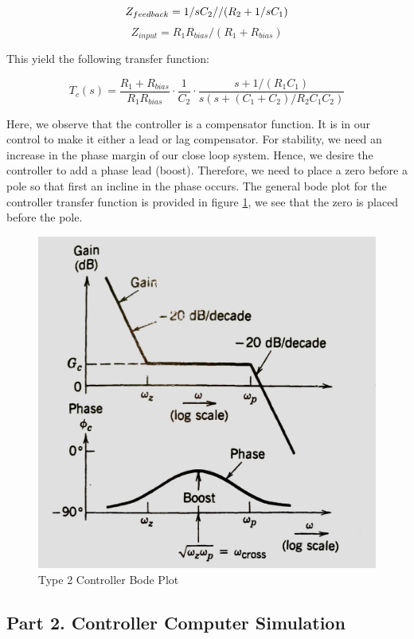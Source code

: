 \documentclass[12pt]{article}
\begin{document}
\begin{equation*}
    Z_{feedback}=1/sC_2// (R_2 +1/sC_1)\\
\end{equation*}
\begin{equation*}
Z_{input}=R_1 R_{bias}/(R_1 + R_{bias})
\end{equation*}

This yield the following transfer function:

\begin{equation*}
T_c(s)=\dfrac{R_1+R_{bias}}{R_1 R_{bias} }\cdot \dfrac{1}{C_2}\cdot \dfrac{s+1/(R_1 C_1)}{s(s+(C_1+C_2)/R_2C_1C_2)}
\end{equation*}

Here, we observe that the controller is a compensator function. It is in our control to make it either a lead or lag compensator. For stability, we need an increase in the phase margin of our close loop system. Hence, we desire the controller to add a phase lead (boost). Therefore, we need to place a zero before a pole so that first an incline in the phase occurs. The general bode plot for the controller transfer function is provided in figure \ref{fig:bode}, we see that the zero is placed before the pole. 

\begin{figure}[H]
    \centering
    \includegraphics[width=10 cm]{bode}
    \caption{Type 2 Controller Bode Plot}
    \label{fig:bode}
\end{figure}

\subsection{Part 2. Controller Computer Simulation}
\end{document}
